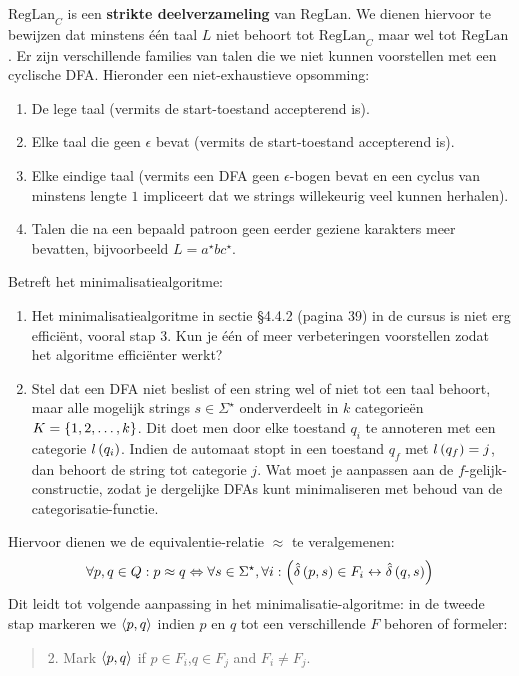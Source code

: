 \documentclass{article}
\begin{document}
\begin{question}
\begin{answer}
$\mbox{RegLan}_C$ is een \textbf{strikte deelverzameling} van $\mbox{RegLan}$. We dienen hiervoor te bewijzen dat minstens \'e\'en taal $L$ niet behoort tot $\mbox{RegLan}_C$ maar wel tot $\mbox{RegLan}$. Er zijn verschillende families van talen die we niet kunnen voorstellen met een cyclische DFA. Hieronder een niet-exhaustieve opsomming:
\begin{enumerate}
 \item De lege taal (vermits de start-toestand accepterend is).
 \item Elke taal die geen $\epsilon$ bevat (vermits de start-toestand accepterend is).
 \item Elke eindige taal (vermits een DFA geen $\epsilon$-bogen bevat en een cyclus van minstens lengte $1$ impliceert dat we strings willekeurig veel kunnen herhalen).
 \item Talen die na een bepaald patroon geen eerder geziene karakters meer bevatten, bijvoorbeeld $L=a^{\star}bc^{\star}$.
\end{enumerate}
\end{answer}
\end{question}

\begin{question}
Betreft het minimalisatiealgoritme:
\begin{enumerate}
 \item Het minimalisatiealgoritme in sectie \S4.4.2 (pagina 39) in de cursus is niet erg effici\"ent, vooral stap 3. Kun je \'e\'en of meer verbeteringen voorstellen zodat het algoritme effici\"enter werkt?
 \item Stel dat een DFA niet beslist of een string wel of niet tot een taal behoort, maar alle mogelijk strings $s\in\Sigma^{\star}$ onderverdeelt in $k$ categorie\"en $K=\left\{ 1,2,\ldots,k \right\}$. Dit doet men door elke toestand $q_i$ te annoteren met een categorie $l\left( q_i \right)$. Indien de automaat stopt in een toestand $q_f$ met $l\left( q_f \right)=j$, dan behoort de string tot categorie $j$. Wat moet je aanpassen aan de $f$-gelijk-constructie, zodat je dergelijke DFAs kunt minimaliseren met behoud van de categorisatie-functie.
\end{enumerate}
\begin{answer}
Hiervoor dienen we de equivalentie-relatie $\approx$ te veralgemenen:
\begin{equation}
\forall p,q\in Q:p\approx q\Leftrightarrow\forall s\in\Sigma^{\star},\forall i:\left( \hat{\delta}\left( p,s \right)\in F_i\leftrightarrow \hat{\delta}\left( q,s \right) \right)
\end{equation}
Dit leidt tot volgende aanpassing in het minimalisatie-algoritme: in de tweede stap markeren we $\left\langle p,q \right\rangle$ indien $p$ en $q$ tot een verschillende $F$ behoren of formeler:
\begin{quote}
2. Mark $\left\langle p,q \right\rangle$ if $p\in F_i$,$q\in F_j$ and $F_i\neq F_j$.
\end{quote}
\end{answer}
\end{question}
\end{document}
